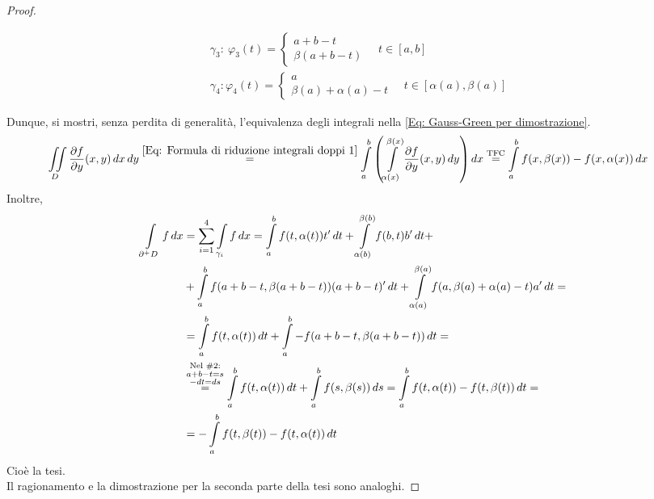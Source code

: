 \begin{proof}
\begin{figure}[H]
\begin{minipage}{0.63\textwidth}
\begin{equation}
\begin{aligned}
                &\gamma_3:\ \varphi_3(t)= \begin{cases}
                    a+b-t\\
                    \beta(a+b-t)
                \end{cases}
                \quad t \in [a,b]\\
                &\gamma_4: \varphi_4(t)= \begin{cases}
                    a\\
                    \beta(a)+\alpha(a)-t
                \end{cases}
                \quad t \in [\alpha(a), \beta(a)]
            \end{aligned}
        \end{equation}
     \end{minipage}
 \end{figure}
 \flushleft Dunque, si mostri, senza perdita di generalità, l'equivalenza degli integrali nella \eqref{Eq: Gauss-Green per dimostrazione}.
 \begin{equation}
    \begin{aligned}
     \iint\limits_D{\frac{\partial f}{\partial y}(x,y)}\,dx\,dy &\overset{\eqref{Eq: Formula di riduzione integrali doppi 1}}{=} \int\limits_{a}^{b}{\left( \int\limits_{\alpha(x)}^{\beta(x)}\frac{\partial f}{\partial y}(x,y)\,dy \right)}\, dx \overset{\text{TFC}}{=}\int\limits_{a}^{b}{ f(x, \beta(x))- f(x, \alpha(x))}\, dx
     \end{aligned}
 \end{equation}
Inoltre, 
\begin{equation}
\begin{aligned}
    \int\limits_{\partial^+ D}{f}\, dx &= \sum\limits_{i=1}^{4} \int\limits_{\gamma_i}{f}\,dx =
    \int\limits_{a}^{b}{f(t, \alpha(t)) t'}\, dt+ \int\limits_{\alpha(b)}^{\beta(b)}{f(b,t)b'}\, dt +\\
    &+\int\limits_{a}^{b}{f(a+b-t, \beta(a+b-t))(a+b-t)'}\, dt + \int\limits_{\alpha(a)}^{\beta(a)}{f(a, \beta(a)+\alpha(a)-t) a'}\, dt=\\
    &= \int\limits_{a}^{b}{f(t, \alpha(t))}\, dt + \int\limits_{a}^{b}{-f(a+b-t, \beta(a+b-t))}\, dt =\\
    &\overset{\substack{\text{Nel }\#2:\\ a+b-t=s\\ -dt=ds}}{=} \int\limits_a^b{f(t, \alpha(t))}\, dt + \int\limits_a^b{f(s, \beta(s))}\, ds = \int\limits_{a}^{b}{f(t, \alpha(t))- f(t, \beta(t))}\, dt=\\
    &=-\int\limits_{a}^{b}{ f(t, \beta(t))- f(t, \alpha(t))}\, dt
    \end{aligned}
\end{equation}
Cioè la tesi.\\
Il ragionamento e la dimostrazione per la seconda parte della tesi sono analoghi.
 \end{proof}
